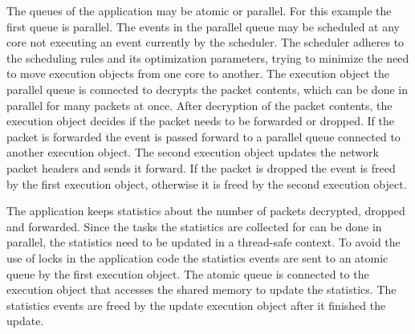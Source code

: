 The queues of the application may be atomic or parallel. For this example the first queue is parallel. The events in the parallel queue may be scheduled at any core not executing an event currently by the scheduler. The scheduler adheres to the scheduling rules and its optimization parameters, trying to minimize the need to move execution objects from one core to another. The execution object the parallel queue is connected to decrypts the packet contents, which can be done in parallel for many packets at once. After decryption of the packet contents, the execution object decides if the packet needs to be forwarded or dropped. If the packet is forwarded the event is passed forward to a parallel queue connected to another execution object. The second execution object updates the network packet headers and sends it forward. If the packet is dropped the event is freed by the first execution object, otherwise it is freed by the second execution object.

The application keeps statistics about the number of packets decrypted, dropped and forwarded. Since the tasks the statistics are collected for can be done in parallel, the statistics need to be updated in a thread-safe context. To avoid the use of locks in the application code the statistics events are sent to an atomic queue by the first execution object. The atomic queue is connected to the execution object that accesses the shared memory to update the statistics. The statistics events are freed by the update execution object after it finished the update.
